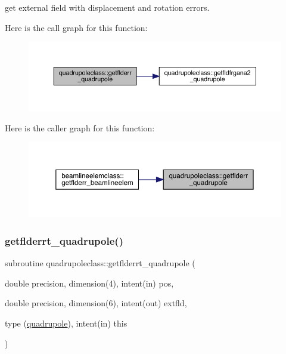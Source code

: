 get external field with displacement and rotation errors. 

Here is the call graph for this function\+:\nopagebreak
\begin{figure}[H]
\begin{center}
\leavevmode
\includegraphics[width=350pt]{namespacequadrupoleclass_a41791f03ec33f0255e54ebc7b9519170_cgraph}
\end{center}
\end{figure}
Here is the caller graph for this function\+:\nopagebreak
\begin{figure}[H]
\begin{center}
\leavevmode
\includegraphics[width=350pt]{namespacequadrupoleclass_a41791f03ec33f0255e54ebc7b9519170_icgraph}
\end{center}
\end{figure}
\mbox{\label{namespacequadrupoleclass_a25a1f7329a298c01c802f96b0547ab6c}} 
\subsubsection{\texorpdfstring{getflderrt\_quadrupole()}{getflderrt\_quadrupole()}}
{\footnotesize\ttfamily subroutine quadrupoleclass\+::getflderrt\+\_\+quadrupole (\begin{DoxyParamCaption}\item[{double precision, dimension(4), intent(in)}]{pos,  }\item[{double precision, dimension(6), intent(out)}]{extfld,  }\item[{type (\mbox{\hyperlink{namespacequadrupoleclass_structquadrupoleclass_1_1quadrupole}{quadrupole}}), intent(in)}]{this }\end{DoxyParamCaption})}



